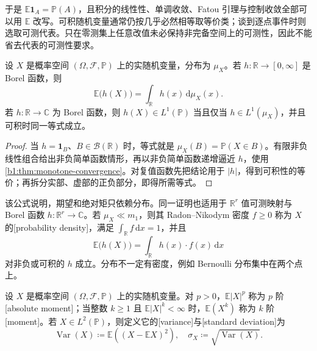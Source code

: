 于是 \(\mathbb E\mathbf1_A=\mathbb P(A)\)，且积分的线性性、单调收敛、Fatou 引理与控制收敛全部可以用 \(\mathbb E\) 改写。可积随机变量通常仍按几乎必然相等取等价类；谈到逐点事件时则选取可测代表。只在零测集上任意改值未必保持非完备空间上的可测性，因此不能省去代表的可测性要求。

\begin{proposition}[按分布计算期望]\label{b1:prop:30-law-integration}
设 \(X\) 是概率空间 \((\Omega,\mathcal F,\mathbb P)\) 上的实随机变量，分布为 \(\mu_X\)。若 \(h:\mathbb R\to[0,\infty]\) 是 Borel 函数，则
\[
 \mathbb E\bigl(h(X)\bigr)=\int_{\mathbb R}h(x)\,\mathrm d\mu_X(x).
\]
若 \(h:\mathbb R\to\mathbb C\) 为 Borel 函数，则 \(h(X)\in L^1(\mathbb P)\) 当且仅当 \(h\in L^1(\mu_X)\)，并且可积时同一等式成立。
\end{proposition}
\begin{proof}
当 \(h=\mathbf1_B\)、\(B\in\mathcal B(\mathbb R)\) 时，等式就是 \(\mu_X(B)=\mathbb P(X\in B)\)。有限非负线性组合给出非负简单函数情形，再以非负简单函数递增逼近 \(h\)，使用\cref{b1:thm:monotone-convergence}。对复值函数先把结论用于 \(|h|\)，得到可积性的等价；再拆分实部、虚部的正负部分，即得所需等式。
\end{proof}

该公式说明，期望和绝对矩只依赖分布。同一证明也适用于 \(\mathbb R^r\) 值可测映射与 Borel 函数 \(h:\mathbb R^r\to\mathbb C\)。若 \(\mu_X\ll m_1\)，则其 Radon--Nikodym 密度 \(f\geq0\) 称为 \(X\) 的[probability density]，满足 \(\int_{\mathbb R}f\,\mathrm dx=1\)，并且
\[
 \mathbb E\bigl(h(X)\bigr)=\int_{\mathbb R}h(x)\cdot f(x)\,\mathrm dx
\]
对非负或可积的 \(h\) 成立。分布不一定有密度，例如 Bernoulli 分布集中在两个点上。

\begin{definition}\label{b1:def:30-moments-variance}
设 \(X\) 是概率空间 \((\Omega,\mathcal F,\mathbb P)\) 上的实随机变量。对 \(p>0\)，\(\mathbb E|X|^p\) 称为 \(p\) 阶[absolute moment]；当整数 \(k\geq1\) 且 \(\mathbb E|X|^k<\infty\) 时，\(\mathbb E(X^k)\) 称为 \(k\) 阶[moment]。若 \(X\in L^2(\mathbb P)\)，则定义它的[variance]与[standard deviation]为
\[
 \operatorname{Var}(X)\coloneqq\mathbb E\left((X-\mathbb E X)^2\right),
 \quad \sigma_X\coloneqq\sqrt{\operatorname{Var}(X)}.
\]
\end{definition}

